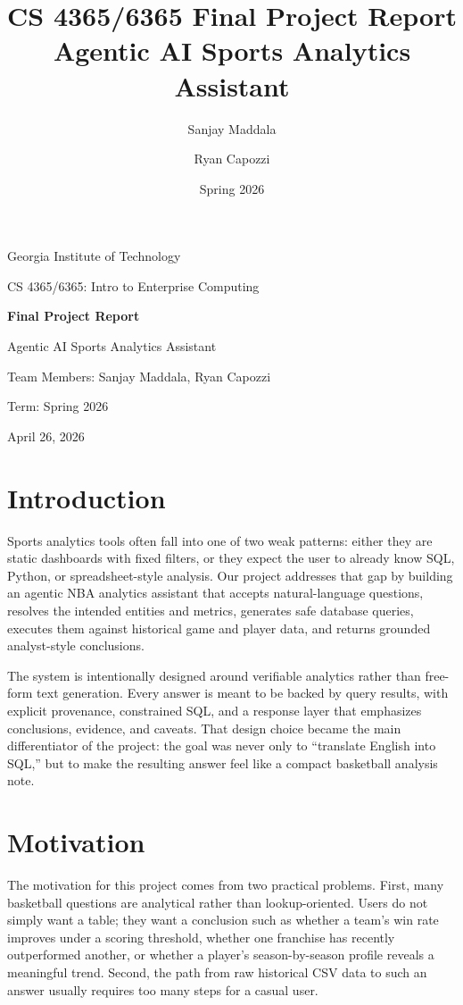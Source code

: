 \documentclass[11pt]{article}
\title{\textbf{CS 4365/6365 Final Project Report}\\[0.4em]
Agentic AI Sports Analytics Assistant}
\author{Sanjay Maddala \and Ryan Capozzi}
\date{Spring 2026}
\begin{document}
\begin{titlepage}
    \centering
    {\Large Georgia Institute of Technology\par}
    \vspace{0.5em}
    {\large CS 4365/6365: Intro to Enterprise Computing\par}
    \vspace{2.5em}
    {\Huge \textbf{Final Project Report}\par}
    \vspace{0.6em}
    {\LARGE Agentic AI Sports Analytics Assistant\par}
    \vspace{2.5em}
    {\large Team Members: Sanjay Maddala, Ryan Capozzi\par}
    \vspace{0.5em}
    {\large Term: Spring 2026\par}
    \vfill
    {\large April 26, 2026\par}
\end{titlepage}

\tableofcontents
\clearpage

\section{Introduction}
Sports analytics tools often fall into one of two weak patterns: either they are static dashboards with fixed filters, or they expect the user to already know SQL, Python, or spreadsheet-style analysis. Our project addresses that gap by building an agentic NBA analytics assistant that accepts natural-language questions, resolves the intended entities and metrics, generates safe database queries, executes them against historical game and player data, and returns grounded analyst-style conclusions.

The system is intentionally designed around verifiable analytics rather than free-form text generation. Every answer is meant to be backed by query results, with explicit provenance, constrained SQL, and a response layer that emphasizes conclusions, evidence, and caveats. That design choice became the main differentiator of the project: the goal was never only to ``translate English into SQL,'' but to make the resulting answer feel like a compact basketball analysis note.

\section{Motivation}
The motivation for this project comes from two practical problems. First, many basketball questions are analytical rather than lookup-oriented. Users do not simply want a table; they want a conclusion such as whether a team's win rate improves under a scoring threshold, whether one franchise has recently outperformed another, or whether a player's season-by-season profile reveals a meaningful trend. Second, the path from raw historical CSV data to such an answer usually requires too many steps for a casual user.
\end{document}
